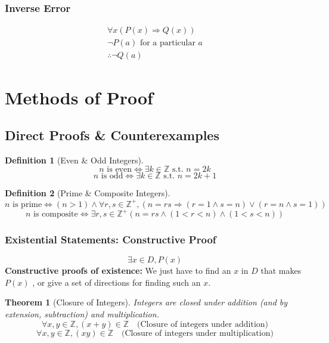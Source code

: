 \documentclass{article}
\theoremstyle{plain}
\newtheorem{theorem}{Theorem}[section]
\theoremstyle{definition}
\newtheorem*{definition}{Definition}
\theoremstyle{remark}
\begin{document}
\subsubsection{Inverse Error}
\[
\begin{array}{l}
    \forall x (P(x) \Rightarrow Q(x)) \\
    \neg P(a) \text{ for a particular } a \\
    \hline
    \therefore \neg Q(a)
\end{array}
\]

\section{Methods of Proof}
\subsection{Direct Proofs \& Counterexamples}

\begin{definition}[Even \& Odd Integers]
    \[ n \text{ is even} \Leftrightarrow \exists k \in \mathbb{Z} \text{ s.t. } n = 2k \]
    \[ n \text{ is odd} \Leftrightarrow \exists k \in \mathbb{Z} \text{ s.t. } n = 2k + 1 \]
\end{definition}

\begin{definition}[Prime \& Composite Integers]
    \[ n \text{ is prime} \Leftrightarrow (n > 1) \wedge \forall r,s \in \mathbb{Z}^+, (n = rs \Rightarrow (r = 1 \wedge s= n) \vee (r=n \wedge s = 1)) \]
    \[ n \text{ is composite} \Leftrightarrow \exists r,s \in \mathbb{Z}^+ (n = rs \wedge (1 < r < n) \wedge (1 < s < n)) \]
\end{definition}

\subsubsection{Existential Statements: Constructive Proof}
\[ \exists x \in D, P(x) \]
\textbf{Constructive proofs of existence:}
We just have to find an $x$ in $D$ that makes $P(x)$ \textcolor{blue}{}, or give a set of directions for finding such an $x$.

\begin{theorem}[Closure of Integers]
    Integers are closed under addition (and by extension, subtraction) and multiplication.
    \[ \forall x, y \in \mathbb{Z}, (x + y) \in \mathbb{Z} \quad \text{(Closure of integers under addition)} \]
    \[ \forall x, y \in \mathbb{Z}, (xy) \in \mathbb{Z} \quad \text{(Closure of integers under multiplication)} \]
\end{theorem}
\end{document}
